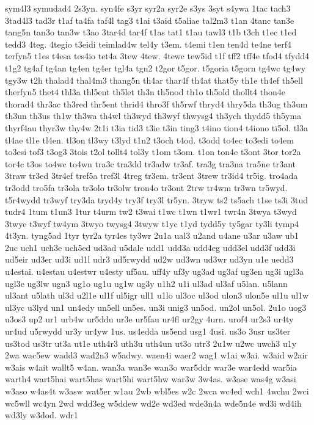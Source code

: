 {sym4l3
symudad4
2s3yn.
syn4fe
s3yr
syr2a
syr2e
s3ys
3syt
s4ywa
1tac
tach3
3tad4l3
tad3r
t1af
ta4fa
taf4l
tag3
t1ai
t3aid
t5aliae
tal2m3
t1an
4tanc
tan3e
tang5n
tan3o
tan3w
t3ao
3tar4d
tar4f
t1as
tat1
t1au
tawl3
t1b
t3ch
t1ec
t1ed
tedd3
4teg.
4tegio
t3eidi
teimlad4w
tel4y
t3em.
t4emi
t1en
ten4d
te4ne
terf4
terfyn5
t1es
t4esa
tes4io
tet4a
3tew
4tew.
4tewc
tew5id
t1f
tff2
tff4e
tfod4
tfydd4
t1g2
tg4af
tg4an
tg4en
tg4er
tgl4a
tgn2
t2gor
t5gor.
t5goria
t5gorn
tg4wc
tg4wy
tgy3w
t2h
thalad4
thal4m3
thang5n
th4ar
thar4f
th4at
that5y
th1e
th4ef
th5ell
therfyn5
thet4
thl3a
thl5ent
th5let
th3n
th5nod
th1o
th5old
thollt4
thon4e
thorad4
thr3ac
th3red
thr5ent
thrid4
thro3f
th5rwf
thryd4
thry5da
th3ug
th3um
th3un
th3us
th1w
th3wa
th4wl
th3wyd
th3wyf
thwysg4
th3ych
thydd5
th5yma
thyrf4au
thyr3w
thy4w
2t1i
t3ia
tid3
t3ie
t3in
ting3
t4ino
tion4
t4iono
tï5ol.
tl3a
tl4ae
tl1e
tl4en.
tl3on
tl3wy
t3lyd
t1n2
t3och
t4od.
t3odd
to4ec
to3edi
to4em
to3esi
tof3
t3og3
3tois
t2ol
tollt4
tol3y
t1om
t3om.
t1on
ton4e
t3ont
3tor
tor2a
tor4c
t3os
to4wc
to4wn
tra3c
tra3dd
tr3adw
tr3af.
tra3g
tra3na
tra5ne
tr3ant
3traw
tr3ed
3tr4ef
tref5a
tref3l
4treg
tr3em.
tr3ent
3trew
tr3id4
tr5ig.
tro4ada
tr3odd
tro5fa
tr3ola
tr3olo
tr3olw
tron4o
tr3ont
2trw
tr4wm
tr3wn
tr5wyd.
t5r4wydd
tr3wyf
try3da
tryd4y
try3f
try3l
tr5yn.
3tryw
ts2
ts5ach
t1se
ts3i
3tud
tudr4
1tum
t1un3
1tur
t4urm
tw2
t3wai
t1wc
t1wn
t1wr1
twr4n
3twya
t3wyd
3twye
t3wyf
tw4ym
3twyo
twysg4
3twyw
t1yc
t1yd
tydd5y
ty5gar
ty3li
tymp4
4t3yn.
tyng5ad
1tyr
tyr2a
tyr4es
ty3wr
2u1a
ual3
u2and
u4ane
u3ar
u3aw
ub1
2uc
uch1
uch3e
uch5ed
ud3ad
u5dale
udd1
udd3a
udd4eg
udd3el
udd3f
udd3i
ud5eir
ud3er
ud3i
ud1l
udr3
ud5rwydd
ud2w
ud3wn
ud3wr
ud3yn
u1e
uedd3
u4estai.
u4estau
u4estwr
u4esty
uf5au.
uff4y
uf3y
ug3ad
ug3af
ug3en
ug3i
ugl3a
ugl3e
ug3lw
ugn3
ug1o
ug1u
ug1w
ug3y
u1h2
u1i
ul3ad
ul3af
u5lan.
u5lann
ul3ant
u5lath
ul3d
u2l1e
ul1f
ul5igr
ull1
u1lo
ul3oc
ul3od
ulon3
ulon5e
ul1u
ul1w
ul3yc
u3lyd
un1
un4edy
un5ell
un5es.
un3i
unig3
un5od.
un2ol
un5ol.
2u1o
uog3
u3os3
up2
ur1
urb4w
ur5ddu
ur3e
ur5fau
ur4fl
ur2gy
4urn.
urof4
ur2s3
ur4ty
ur4ud
u5rwydd
ur3y
ur4yw
1us.
us4edda
us5end
usg1
4usi.
us3o
3usr
us3ter
us3tod
us3tr
ut3a
ut1e
uth4r3
uth3u
uth4un
ut3o
utr3
2u1w
u2wc
uwch3
u1y
2wa
wac5ew
wadd3
wad2n3
w5adwy.
waen4i
waer2
wag1
w1ai
w3ai.
w3aid
w2air
w3ais
w4ait
wallt5
w4an.
wan3a
wan3e
wan3o
war5ddr
war3e
war4edd
war5ia
warth4
wart5hai
wart5has
wart5hi
wart5hw
war3w
3w4as.
w3ase
was4g
w3asi
w3aso
w4as4t
w3asw
wat5er
w1au
2wb
wbl5es
w2c
2wca
wc4ed
wch1
4wchu
2wci
wc5wll
wc4yn
2wd
wdd3eg
w5ddew
wd2e
wd3ed
wde3n4a
wde5n4e
wd3i
wd4ih
wd3ly
w3dod.
wdr1
}
